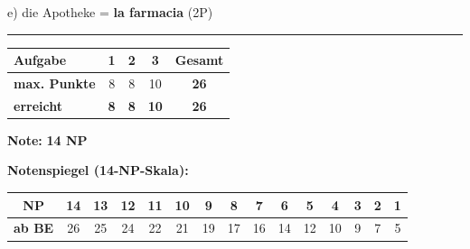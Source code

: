 \documentclass[11pt, a4paper]{article}
\newcommand{\lsg}[1]{\textcolor{loesung}{\textbf{#1}}}
\begin{document}
\noindent
e) die Apotheke = \lsg{la farmacia} \hfill (2P)


\vspace{25pt}
\hrule
\vspace{10pt}

\noindent
\begin{tabularx}{\textwidth}{|X|c|c|c||c|}
\hline
\textbf{Aufgabe} & 1 & 2 & 3 & \textbf{Gesamt} \\
\hline
\textbf{max. Punkte} & 8 & 8 & 10 & \textbf{26} \\
\hline
\textbf{erreicht} & \lsg{8} & \lsg{8} & \lsg{10} & \lsg{26} \\
\hline
\end{tabularx}

\vspace{10pt}

\begin{flushright}
\textbf{Note:} \lsg{14 NP}
\end{flushright}

\vspace{1em}

\textbf{Notenspiegel (14-NP-Skala):}

\begin{center}
\footnotesize
\begin{tabular}{|c|c|c|c|c|c|c|c|c|c|c|c|c|c|c|}
\hline
\textbf{NP} & 14 & 13 & 12 & 11 & 10 & 9 & 8 & 7 & 6 & 5 & 4 & 3 & 2 & 1 \\
\hline
\textbf{ab BE} & 26 & 25 & 24 & 22 & 21 & 19 & 17 & 16 & 14 & 12 & 10 & 9 & 7 & 5 \\
\hline
\end{tabular}
\end{center}
\end{document}
